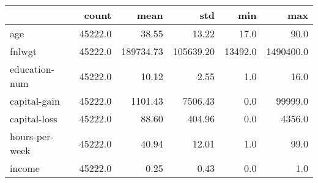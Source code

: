 \begin{tabular}{lrrrrr}
\toprule
{} &    count &       mean &        std &      min &        max \\
\midrule
age            &  45222.0 &      38.55 &      13.22 &     17.0 &       90.0 \\
fnlwgt         &  45222.0 &  189734.73 &  105639.20 &  13492.0 &  1490400.0 \\
education-num  &  45222.0 &      10.12 &       2.55 &      1.0 &       16.0 \\
capital-gain   &  45222.0 &    1101.43 &    7506.43 &      0.0 &    99999.0 \\
capital-loss   &  45222.0 &      88.60 &     404.96 &      0.0 &     4356.0 \\
hours-per-week &  45222.0 &      40.94 &      12.01 &      1.0 &       99.0 \\
income         &  45222.0 &       0.25 &       0.43 &      0.0 &        1.0 \\
\bottomrule
\end{tabular}
